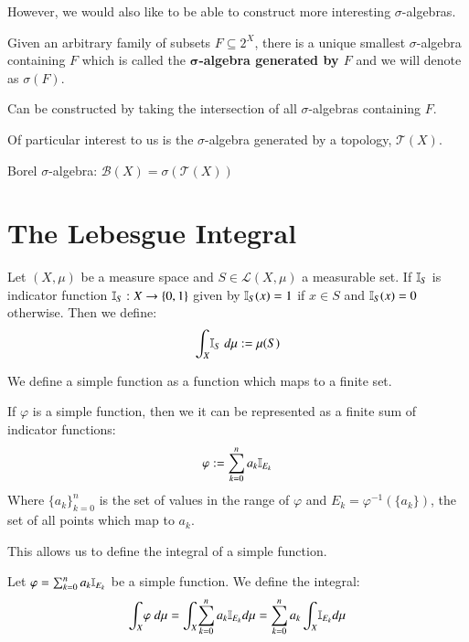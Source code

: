 However, we would also like to be able to construct more interesting $\sigma$-algebras.

\begin{definition}
Given an arbitrary family of subsets $F \subseteq 2^X$, there is a unique smallest $\sigma$-algebra containing $F$ which is called the \textbf{$\mathbf{\sigma}$-algebra generated by $F$} and we will denote as $\sigma(F)$.
\end{definition}

Can be constructed by taking the intersection of all $\sigma$-algebras containing $F$.

Of particular interest to us is the $\sigma$-algebra generated by a topology, $\mathcal{T}(X)$. 

Borel $\sigma$-algebra: $\mathcal{B}(X) = \sigma(\mathcal{T}(X))$

\section{The Lebesgue Integral}

\begin{definition}
Let $(X, \mu )$ be a measure space and $S \in \mathcal{L}(X, \mu)$ a measurable set. If $\ind[S]$ is indicator function $\ind[S] : X \to \{ 0, 1 \}$ given by $\ind[S] (x) = 1$ if $x \in S$ and $\ind[S] (x) = 0$ otherwise.
Then we define:
\begin{equation}
\int_X \! \ind[S] \; d \mu := \mu ( S )
\end{equation}
\end{definition}

We define a simple function as a function which maps to a finite set.
\begin{theorem}
If $\varphi$ is a simple function, then we it can be represented as a finite sum of indicator functions:
\begin{equation}
\varphi := \sum_{k=0}^n a_k \ind[E_k]
\end{equation}
Where $\{ a_k \}_{k=0}^n$ is the set of values in the range of $\varphi$ and $E_k = \varphi^{-1}( \{ a_k \} )$, the set of all points which map to $a_k$.
\end{theorem}

This allows us to define the integral of a simple function.

\begin{definition}
Let $\varphi = \sum_{k=0}^n a_k \ind[E_k]$ be a simple function. We define the integral:
\begin{equation}
\int_X \! \varphi \; d \mu = \int_X \! \sum_{k=0}^n a_k \ind[E_k] d \mu = \sum_{k=0}^n a_k  \int_X \! \ind[E_k] d \mu
\end{equation}
\end{definition}

